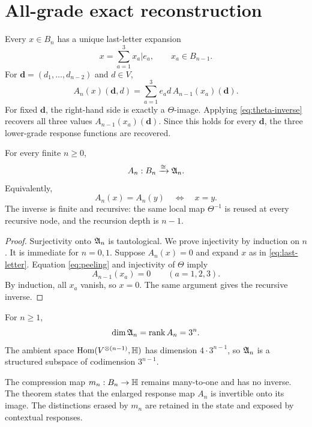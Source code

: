 \section{All-grade exact reconstruction}\label{sec:reconstruction}

Every $x\in B_n$ has a unique last-letter expansion
\begin{equation}\label{eq:last-letter}
  x=\sum_{a=1}^3 x_a|e_a,
  \qquad x_a\in B_{n-1}.
\end{equation}
For $\mathbf d=(d_1,\ldots,d_{n-2})$ and $d\in V$,
\begin{equation}\label{eq:peeling}
  A_n(x)(\mathbf d,d)
  =\sum_{a=1}^3 e_a d\,A_{n-1}(x_a)(\mathbf d).
\end{equation}
For fixed $\mathbf d$, the right-hand side is exactly a $\Theta$-image.  Applying \eqref{eq:theta-inverse} recovers all three values $A_{n-1}(x_a)(\mathbf d)$.  Since this holds for every $\mathbf d$, the three lower-grade response functions are recovered.

\begin{theorem}\label{thm:all-grade}
For every finite $n\ge0$,
\[
  A_n:B_n\xrightarrow{\cong}\mathfrak A_n.
\]
Equivalently,
\[
  A_n(x)=A_n(y)\quad\Longleftrightarrow\quad x=y.
\]
The inverse is finite and recursive: the same local map $\Theta^{-1}$ is reused at every recursive node, and the recursion depth is $n-1$.
\end{theorem}

\begin{proof}
Surjectivity onto $\mathfrak A_n$ is tautological.  We prove injectivity by induction on $n$.  It is immediate for $n=0,1$.  Suppose $A_n(x)=0$ and expand $x$ as in \eqref{eq:last-letter}.  Equation \eqref{eq:peeling} and injectivity of $\Theta$ imply
\[
  A_{n-1}(x_a)=0\qquad(a=1,2,3).
\]
By induction, all $x_a$ vanish, so $x=0$.  The same argument gives the recursive inverse.
\end{proof}

\begin{corollary}
For $n\ge1$,
\[
  \dim\mathfrak A_n=\operatorname{rank}A_n=3^n.
\]
The ambient space $\operatorname{Hom}(V^{\otimes(n-1)},\mathbb H)$ has dimension $4\cdot3^{n-1}$, so $\mathfrak A_n$ is a structured subspace of codimension $3^{n-1}$.
\end{corollary}

\begin{remark}
The compression map $m_n:B_n\to\mathbb H$ remains many-to-one and has no inverse.  The theorem states that the enlarged response map $A_n$ is invertible onto its image.  The distinctions erased by $m_n$ are retained in the state and exposed by contextual responses.
\end{remark}

